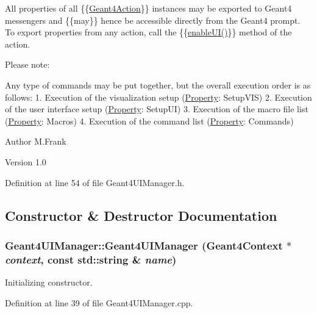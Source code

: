 All properties of all \{\{\hyperlink{class_d_d4hep_1_1_simulation_1_1_geant4_action}{Geant4Action}\}\} instances may be exported to Geant4 messengers and \{{\itshape \/}\{may\}\} hence be accessible directly from the Geant4 prompt. To export properties from any action, call the \{\{\hyperlink{class_d_d4hep_1_1_simulation_1_1_geant4_action_a3cc9526eece0aaceec6b62fa74d8c055}{enableUI()}\}\} method of the action.

Please note:

Any type of commands may be put together, but the overall execution order is as follows: 1. Execution of the visualization setup (\hyperlink{class_d_d4hep_1_1_property}{Property}: SetupVIS) 2. Execution of the user interface setup (\hyperlink{class_d_d4hep_1_1_property}{Property}: SetupUI) 3. Execution of the macro file list (\hyperlink{class_d_d4hep_1_1_property}{Property}: Macros) 4. Execution of the command list (\hyperlink{class_d_d4hep_1_1_property}{Property}: Commands)

\begin{DoxyAuthor}{Author}
M.Frank 
\end{DoxyAuthor}
\begin{DoxyVersion}{Version}
1.0 
\end{DoxyVersion}


Definition at line 54 of file Geant4UIManager.h.

\subsection{Constructor \& Destructor Documentation}
\hypertarget{class_d_d4hep_1_1_simulation_1_1_geant4_u_i_manager_a80b987d5f8456101424ab3c4ac69c08e}{
\subsubsection[{Geant4UIManager}]{\setlength{\rightskip}{0pt plus 5cm}Geant4UIManager::Geant4UIManager ({\bf Geant4Context} $\ast$ {\em context}, \/  const std::string \& {\em name})}}
\label{class_d_d4hep_1_1_simulation_1_1_geant4_u_i_manager_a80b987d5f8456101424ab3c4ac69c08e}


Initializing constructor. 

Definition at line 39 of file Geant4UIManager.cpp.

